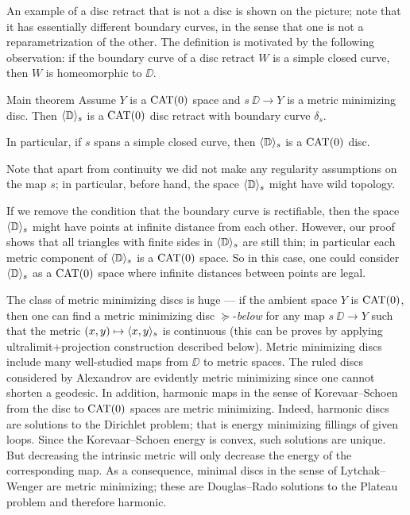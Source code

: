 \documentclass{article}
\begin{document}
An example of a disc retract that is not a disc is shown on the picture;
note that it has essentially different boundary curves,
in the sense that one is not a reparametrization of the other.
The definition is motivated by the following observation: if the boundary curve of a disc retract $W$ is a simple closed curve, then $W$ is homeomorphic to $\DD$.




\begin{thm}{Main theorem}\label{thm:main}
Assume $Y$ is a $\mathop{\rm CAT}\nolimits(0)$ space and $s\:\DD\to Y$ is a metric minimizing disc.
Then $\langle\mathbb{D}\rangle_s$ is a $\mathop{\rm CAT}\nolimits(0)$ disc retract with boundary curve $\delta_s$.

In particular, if $s$ spans a simple closed curve, then $\langle\mathbb{D}\rangle_s$ is a $\mathop{\rm CAT}\nolimits(0)$ disc.
\end{thm}



Note that apart from continuity we did not make any regularity assumptions on the map $s$;
in particular, before hand, the space $\langle\mathbb{D}\rangle_s$ might have wild topology.

If we remove the condition that the boundary curve is rectifiable, then the space $\langle\mathbb{D}\rangle_s$ might have points at infinite distance from each other.
However, our proof shows that all triangles with finite sides in $\langle\mathbb{D}\rangle_s$ are still thin; 
in particular each metric component of $\langle\mathbb{D}\rangle_s$ is a $\mathop{\rm CAT}\nolimits(0)$ space.
So in this case, one could consider $\langle\mathbb{D}\rangle_s$ as a $\mathop{\rm CAT}\nolimits(0)$ space where infinite distances between points are legal.

The class of metric minimizing discs is huge --- if the ambient space $Y$ is $\mathop{\rm CAT}\nolimits(0)$, then one can find a metric minimizing  disc $\succcurlyeq$-\emph{below} for
any map $s\:\DD\to Y$ such that the metric $(x,y)\mapsto\langle x,y\rangle_s$ is continuous
(this can be proves by applying ultralimit+projection construction described below).
Metric minimizing discs include many well-studied maps from $\DD$ to metric spaces.
The ruled discs considered by Alexandrov \cite{A} are evidently metric minimizing since one cannot shorten a geodesic. 
In addition, harmonic maps in the sense of Korevaar--Schoen \cite{KS} from the disc to $\mathop{\rm CAT}\nolimits(0)$ spaces are metric minimizing.
Indeed, harmonic discs are solutions to the Dirichlet problem;
that is energy minimizing fillings of given loops.
Since the Korevaar--Schoen energy is convex, such solutions are unique. But decreasing the intrinsic metric will only decrease the energy of the corresponding map.
As a consequence, minimal discs in the sense of Lytchak--Wenger \cite{LW} are metric minimizing;
these are Douglas--Rado solutions to the Plateau problem and therefore harmonic. 
\end{document}
